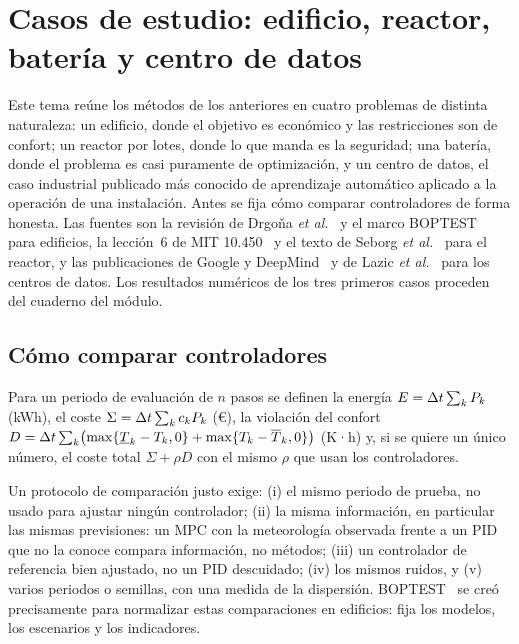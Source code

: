 \chapter{Casos de estudio: edificio, reactor, batería y centro de datos}
\label{tema:5}

Este tema reúne los métodos de los anteriores en cuatro problemas de distinta naturaleza: un edificio, donde el objetivo es económico y las restricciones son de confort; un reactor por lotes, donde lo que manda es la seguridad; una batería, donde el problema es casi puramente de optimización, y un centro de datos, el caso industrial publicado más conocido de aprendizaje automático aplicado a la operación de una instalación. Antes se fija cómo comparar controladores de forma honesta. Las fuentes son la revisión de Drgoňa \emph{et al.}~\cite{drgona} y el marco BOPTEST~\cite{boptest} para edificios, la lección~6 de MIT 10.450~\cite{mit10450} y el texto de Seborg \emph{et al.}~\cite{seborg} para el reactor, y las publicaciones de Google y DeepMind~\cite{evansgao,gamblegao} y de Lazic \emph{et al.}~\cite{lazic} para los centros de datos. Los resultados numéricos de los tres primeros casos proceden del cuaderno del módulo.

\section{Cómo comparar controladores}

\begin{definicion}\label{def:kpi}
Para un periodo de evaluación de $n$ pasos se definen la energía $E=\Delta t\sum_kP_k$ (kWh), el coste $\Sigma=\Delta t\sum_kc_kP_k$ (€), la violación del confort $D=\Delta t\sum_k\bigl(\max\{\underline T_k-T_k,0\}+\max\{T_k-\overline T_k,0\}\bigr)$ (K·h) y, si se quiere un único número, el coste total $\Sigma+\rho D$ con el mismo $\rho$ que usan los controladores.
\end{definicion}

Un protocolo de comparación justo exige: (i) el mismo periodo de prueba, no usado para ajustar ningún controlador; (ii) la misma información, en particular las mismas previsiones: un MPC con la meteorología observada frente a un PID que no la conoce compara información, no métodos; (iii) un controlador de referencia bien ajustado, no un PID descuidado; (iv) los mismos ruidos, y (v) varios periodos o semillas, con una medida de la dispersión. BOPTEST~\cite{boptest} se creó precisamente para normalizar estas comparaciones en edificios: fija los modelos, los escenarios y los indicadores.

